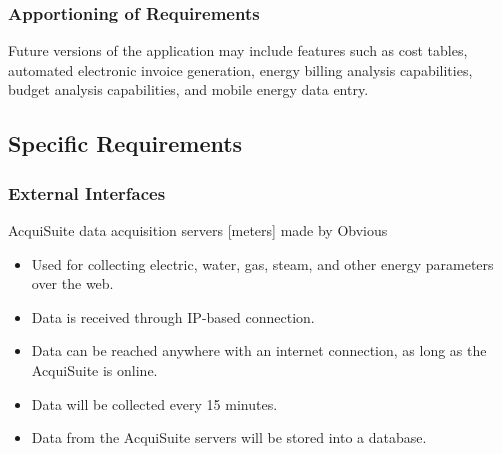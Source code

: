     \subsubsection{Apportioning of Requirements}
    Future versions of the application may include features such as cost tables, automated electronic invoice generation, energy billing analysis capabilities, budget analysis capabilities, and mobile energy data entry.
    
    \subsection{Specific Requirements}
    
    \subsubsection{External Interfaces}
    AcquiSuite data acquisition servers [meters] made by Obvious
    \begin{itemize}
        \setlength\itemsep{1mm}
        \item Used for collecting electric, water, gas, steam, and other energy parameters over the web.
        \item Data is received through IP-based connection.
        \item Data can be reached anywhere with an internet connection, as long as the AcquiSuite is online.
        \item Data will be collected every 15 minutes.
        \item Data from the AcquiSuite servers will be stored into a database.
    \end{itemize}

